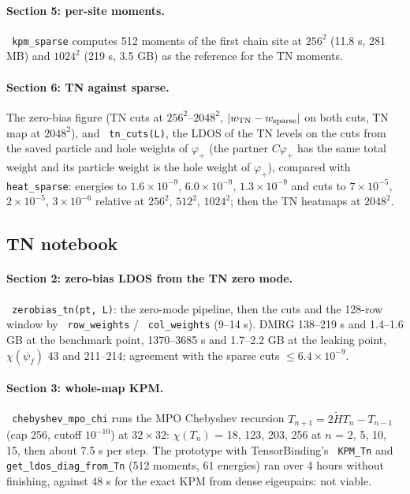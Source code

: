 \documentclass[11pt]{article}
\renewcommand{\code}[1]{\texttt{\hyphenchar\font=-1 #1}}
\begin{document}
\paragraph{Section 5: per-site moments.} \code{kpm\_sparse} computes 512 moments of the first chain site at $256^2$ (11.8 s, 281 MB) and $1024^2$
(219 s, 3.5 GB) as the reference for the TN moments.

\paragraph{Section 6: TN against sparse.} The zero-bias figure (TN cuts at $256^2$--$2048^2$, $|w_{\rm TN}-w_{\rm sparse}|$ on both cuts, TN map at
$2048^2$), and \code{tn\_cuts(L)}, the LDOS of the TN levels on the cuts from the saved particle and hole weights of $\varphi_+$ (the partner
$C\varphi_+$ has the same total weight and its particle weight is the hole weight of $\varphi_+$), compared with \code{heat\_sparse}: energies to
$1.6\times10^{-9}$, $6.0\times10^{-9}$, $1.3\times10^{-9}$ and cuts to $7\times10^{-5}$, $2\times10^{-5}$, $3\times10^{-6}$ relative at $256^2$, $512^2$, $1024^2$; then
the TN heatmaps at $2048^2$.

\subsection{TN notebook}

\paragraph{Section 2: zero-bias LDOS from the TN zero mode.} \code{zerobias\_tn(pt, L)}: the zero-mode pipeline, then the cuts and the 128-row
window by \code{row\_weights} / \code{col\_weights} (9--14 s). DMRG 138--219 s and 1.4--1.6 GB at the benchmark point, 1370--3685 s and 1.7--2.2 GB
at the leaking point, $\chi(\psi_f)$ 43 and 211--214; agreement with the sparse cuts $\le6.4\times10^{-9}$.

\paragraph{Section 3: whole-map KPM.} \code{chebyshev\_mpo\_chi} runs the MPO Chebyshev recursion $T_{n+1} = 2\tilde HT_n - T_{n-1}$ (cap 256,
cutoff $10^{-10}$) at $32\times32$: $\chi(T_n)$ = 18, 123, 203, 256 at $n$ = 2, 5, 10, 15, then about 7.5 s per step. The prototype with
TensorBinding's \code{KPM\_Tn} and \code{get\_ldos\_diag\_from\_Tn} (512 moments, 61 energies) ran over 4 hours without finishing, against 48 s for
the exact KPM from dense eigenpairs: not viable.
\end{document}
